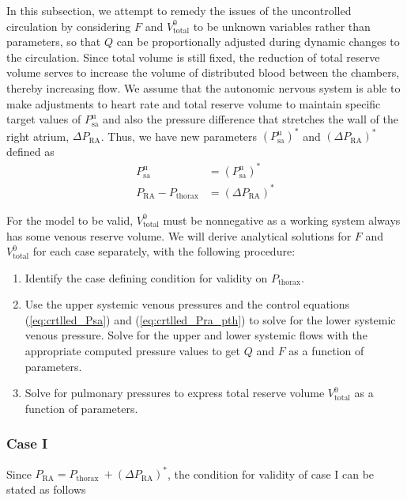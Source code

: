 \documentclass[12pt]{article}
\begin{document}
In this subsection, we attempt to remedy the issues of the uncontrolled circulation by considering $F$ and $V^0_\text{total}$ to be unknown variables rather than parameters, so that $Q$ can be proportionally adjusted during dynamic changes to the circulation. Since total volume is still fixed, the reduction of total reserve volume serves to increase the volume of distributed blood between the chambers, thereby increasing flow. 
We assume that the autonomic nervous system is able to make adjustments to heart rate and total reserve volume to maintain specific target values of $P_\text{sa}^\text{u}$ and also the pressure difference that stretches the wall of the right atrium, $\Delta P_\text{RA}$. Thus, we have new parameters $\left( P_{\text{sa}}^\text{u} \right)^*$ and $\left( \Delta P_{\text{RA}} \right)^*$ defined as
\begin{align}
    P_{\text{sa}}^\text{u} &= \left( P_{\text{sa}}^\text{u} \right)^* \label{eq:crtlled_Psa}\\
    P_{\text{RA}} - P_{\text{thorax}} &= \left( \Delta P_{\text{RA}} \right)^* \label{eq:crtlled_Pra_pth}
\end{align}

For the model to be valid, $V_\text{total}^0$ must be nonnegative as a working system always has some venous reserve volume. We will derive analytical solutions for $F$ and $V^0_\text{total}$ for each case separately, with the following procedure: 
\begin{enumerate}
    \item Identify the case defining condition for validity on $P_\text{thorax}$.
    \item Use the upper systemic venous pressures and the control equations (\ref{eq:crtlled_Psa}) and (\ref{eq:crtlled_Pra_pth}) to solve for the lower systemic venous pressure.  Solve for the upper and lower systemic flows with the appropriate computed pressure values to get $Q$ and $F$ as a function of parameters. 
    \item Solve for pulmonary pressures to express total reserve volume $V^0_\text{total}$ as a function of parameters.
\end{enumerate}

\subsubsection{Case I}
Since \(P_{\text{RA}}=P_{\text {thorax }}+\left(\Delta P_{\text{RA}}\right)^{*}\), the condition for validity of case I can  be stated as follows 
\end{document}
